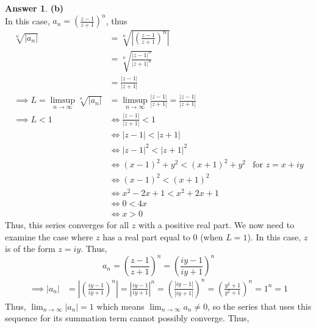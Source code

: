 \documentclass[10pt,a4paper]{article}
\theoremstyle{definition}
\newtheorem*{answer*}{Answer}
\begin{document}
\begin{answer*}{\textbf{(b)}}
\\In this case, $\displaystyle a_n = \left(\frac{z - 1}{z + 1}\right)^n$, thus
\begin{align*}
\sqrt[n]{|a_n|} &= \sqrt[n]{\left|\left(\frac{z - 1}{z + 1}\right)^n\right|}\\
&= \sqrt[n]{\frac{|z - 1|^n}{|z + 1|^n}}\\
&= \frac{|z - 1|}{|z + 1|}\\
\implies L = \limsup_{n \to \infty} \sqrt[n]{|a_n|} &= \limsup_{n \to \infty} \frac{|z - 1|}{|z +1|} = \frac{|z - 1|}{|z + 1|}\\
\implies L < 1 &\iff \frac{|z-1|}{|z+1|} < 1\\
&\iff |z - 1| < |z + 1|\\
&\iff |z - 1|^2 < |z + 1|^2\\
&\iff (x - 1)^2 + y^2 < (x + 1)^2 + y^2 &\text{for $z = x + iy$}\\
&\iff (x - 1)^2 < (x + 1)^2\\
&\iff x^2 - 2x + 1 < x^2 + 2x + 1\\
&\iff 0 < 4x\\
&\iff x > 0
\end{align*}
Thus, this series converges for all $z$ with a positive real part. We now need to examine the case where $z$ has a real part equal to $0$ (when $L = 1$). In this case, $z$ is of the form $z = iy$. Thus,
\[a_n = \left(\frac{z - 1}{z + 1}\right)^n = \left(\frac{iy - 1}{iy + 1}\right)^n\]
\begin{align*}
\implies |a_n| &= \left|\left(\frac{iy - 1}{iy + 1}\right)^n\right| = \left|\frac{iy - 1}{iy + 1}\right|^n = \left(\frac{|iy - 1|}{|iy + 1|}\right)^n = \left(\frac{y^2 + 1}{y^2 + 1}\right)^n = 1^n = 1
\end{align*}
Thus, $\lim_{n \to \infty}|a_n| = 1$ which means $\lim_{n \to \infty} a_n \neq 0$, so the series that uses this sequence for its summation term cannot possibly converge. Thus, 
\end{answer*}
\end{document}
